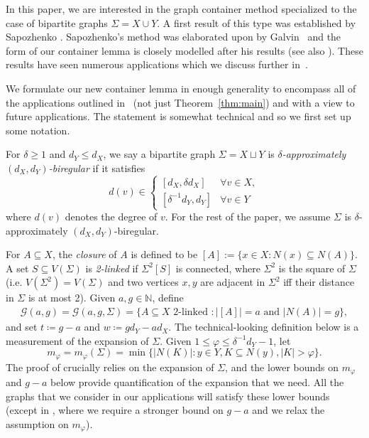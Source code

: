 \documentclass[10pt,a4paper]{amsart}
\theoremstyle{definition}
\newcommand{\cG}{\mathcal{G} }
\newcommand{\gd}[0]{\delta }
\newcommand{\sub}[0]{\subseteq}
\newcommand{\0}[0]{\emptyset}
\begin{document}
In this paper, we are interested in the graph container method specialized to the case of bipartite graphs $\Sigma=X \cup 
 Y$. A first result of this type was established by Sapozhenko \cite{sapocontainer}. Sapozhenko's method was elaborated upon by Galvin~\cite{Galvin_independent} and the form of our container lemma is closely modelled after his results (see also \cite{galvin_threshold, galvin2006slow}).  These results have seen numerous applications which we discuss further in~.

We formulate our new container lemma in enough generality to encompass all of the applications outlined in~ (not just Theorem~\ref{thm:main}) and with a view to future applications. The statement is somewhat technical and so we first set up some notation.

For $\delta\geq 1$ and $d_Y \le d_X$, we say a bipartite graph $\Sigma=X \sqcup Y$ is \emph{$\delta$-approximately $(d_X, d_Y)$-biregular} if it satisfies 
\[d(v) \in \begin{cases}
    [d_X, \delta d_X] &\forall v\in X, \\
    [\delta^{-1}d_Y, d_Y]  & \forall v\in Y
    \end{cases}\]
where $d(v)$ denotes the degree of $v$.
For the rest of the paper, we assume $\Sigma$ is $\gd$-approximately $(d_X, d_Y)$-biregular. 

For $A \sub X$, the \textit{closure} of $A$ is defined to be  $[A]:=\{x \in X: N(x) \sub N(A)\}.$ A set $S \sub V(\Sigma)$ is \textit{2-linked} if $\Sigma^2[S]$ is connected, where $\Sigma^2$ is the square of $\Sigma$ (i.e. $V(\Sigma^2)=V(\Sigma)$ and two vertices $x,y$ are adjacent in $\Sigma^2$ iff their distance in $\Sigma$ is at most 2). Given $a, g\in\mathbb{N}$, define
\begin{align}\label{eq:GagDef}
\cG(a,g)=\cG(a,g,\Sigma)=\{A \subseteq X \text{ 2-linked }: |[A]|=a \text{ and } |N(A)|=g\},
\end{align}
and set $t\coloneqq g-a$ and $w\coloneqq gd_Y-ad_X$.
The technical-looking definition below is a measurement of the expansion of $\Sigma$.  Given $1\leq \varphi \leq \delta^{-1}d_Y-1$, let
\[m_\varphi=m_\varphi(\Sigma)=\min\{|N(K)|: y \in Y, K \sub N(y), |K| >\varphi\}.\]
The proof of  crucially relies on the expansion of $\Sigma$, and the lower bounds on $m_\varphi$ and $g-a$ below provide quantification of the expansion that we need. All the graphs that we consider in our applications will satisfy these lower bounds (except in , where we require a stronger bound on $g-a$ and we relax the assumption on $m_{\varphi}$).
\end{document}
